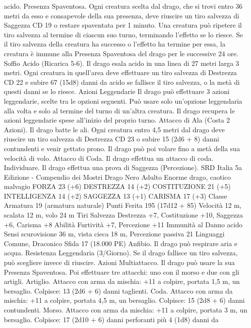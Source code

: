 \begin{multicols}{2}
acido.
Presenza Spaventosa. Ogni creatura scelta dal drago, che si trovi
entro 36 metri da esso e consapevole della sua presenza, deve
riuscire un tiro salvezza di Saggezza CD 19 o restare spaventata
per 1 minuto. Una creatura può ripetere il tiro salvezza al termine
di ciascun suo turno, terminando l’effetto se lo riesce. Se il tiro
salvezza della creatura ha successo o l’effetto ha termine per
essa, la creatura è immune alla Presenza Spaventosa del drago
per le successive 24 ore.
Soffio Acido (Ricarica 5-6). Il drago esala acido in una linea di
27 metri larga 3 metri. Ogni creatura in quell’area deve effettuare
un tiro salvezza di Destrezza CD 22 e subire 67 (15d8) danni da
acido se fallisce il tiro salvezza, o la metà di questi danni se lo
riesce.
Azioni Leggendarie
Il drago può effettuare 3 azioni leggendarie, scelte tra le opzioni
seguenti. Può usare solo un’opzione leggendaria alla volta e solo
al termine del turno di un’altra creatura. Il drago recupera le
azioni leggendarie spese all’inizio del proprio turno.
Attacco di Ala (Costa 2 Azioni). Il drago batte le ali. Ogni
creatura entro 4,5 metri dal drago deve riuscire un tiro salvezza
di Destrezza CD 23 o subire 15 (2d6 + 8) danni contundenti e
venir gettato prono. Il drago può poi volare fino a metà della sua
velocità di volo.
Attacco di Coda. Il drago effettua un attacco di coda.
Individuare. Il drago effettua una prova di Saggezza
(Percezione).
SRD Italia 5a Edizione - Compendio dei Mostri
Drago Nero Adulto
Enorme drago, caotico malvagio
FORZA 23 (+6)
DESTREZZA 14 (+2)
COSTITUZIONE 21 (+5)
INTELLIGENZA 14 (+2)
SAGGEZZA 13 (+1)
CARISMA 17 (+3)
Classe Armatura 19 (armatura naturale)
Punti Ferita 195 (17d12 + 85)
Velocità 12 m, scalata 12 m, volo 24 m
Tiri Salvezza Destrezza +7, Costituzione +10, Saggezza +6,
Carisma +8
Abilità Furtività +7, Percezione +11
Immunità al Danno acido
Sensi scurovisione 36 m, vista cieca 18 m, Percezione passiva 21
Linguaggi Comune, Draconico
Sfida 17 (18.000 PE)
Anfibio. Il drago può respirare aria e acqua.
Resistenza Leggendaria (3/Giorno). Se il drago fallisce un tiro
salvezza, può scegliere invece di riuscire.
Azioni
Multiattacco. Il drago può usare la sua Presenza Spaventosa. Poi
effettuare tre attacchi: uno con il morso e due con gli artigli.
Artiglio. Attacco con arma da mischia: +11 a colpire, portata 1,5
m, un bersaglio.
Colpisce: 13 (2d6 + 6) danni taglienti.
Coda. Attacco con arma da mischia: +11 a colpire, portata 4,5
m, un bersaglio.
Colpisce: 15 (2d8 + 6) danni contundenti.
Morso. Attacco con arma da mischia: +11 a colpire, portata 3 m,
un bersaglio.
Colpisce: 17 (2d10 + 6) danni perforanti più 4 (1d8) danni da

\end{multicols}
